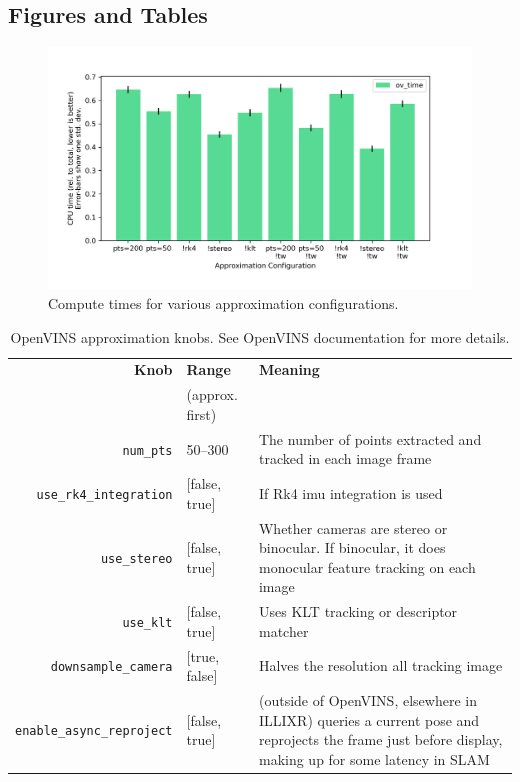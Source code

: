\subsection{Figures and Tables}

\begin{figure}[H]
  \label{compute-times}
  \caption{Compute times for various approximation configurations.}
  \includegraphics[width=\columnwidth]{times.png}
\end{figure}

\begin{table}
  \centering
  {
    \caption{OpenVINS approximation knobs. See OpenVINS documentation for more details\cite{Geneva2020ICRA}.}
    \begin{tabularx}{\linewidth}{r||l|X}
      \textbf{Knob} & \textbf{Range} & \textbf{Meaning} \\
      & {(approx. first)} & \\
      \hline\hline
      \verb+num_pts+ & 50--300 & The number of points extracted and tracked in each image frame \\
      \verb+use_rk4_integration+ & [false, true] & If Rk4 imu integration is used\\
      \verb+use_stereo+ & [false, true] & Whether cameras are stereo or binocular. If binocular, it does monocular feature tracking on each image \\
      \verb+use_klt+ & [false, true] & Uses KLT tracking or descriptor matcher \\
      \verb+downsample_camera+ & [true, false] & Halves the resolution all tracking image \\
      \verb+enable_async_reproject+ & [false, true] & (outside of OpenVINS, elsewhere in ILLIXR) queries a current pose and reprojects the frame just before display, making up for some latency in SLAM \\
    \end{tabularx}
  }
\end{table}

